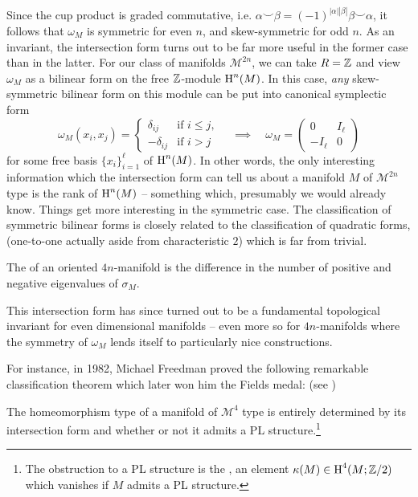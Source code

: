 
Since the cup product is graded commutative, i.e. $\alpha\smile \beta = (-1)^{|\alpha||\beta|} \beta\smile\alpha$, it follows that $\omega_M$ is symmetric for even $n$, and skew-symmetric for odd $n$. As an invariant, the intersection form turns out to be far more useful in the former case than in the latter.
For our class of manifolds $\mathscr{M}^{2n}$, we can take $R=\mathbb{Z}$ and view $\omega_M$ as a bilinear form on the free $\mathbb{Z}$-module $\operatorname{H}^n(M)$. In this case, \emph{any} skew-symmetric bilinear form on this module can be put into canonical symplectic form
\[
	\omega_M(x_i, x_j) = \begin{cases}\delta_{ij} & \textrm{if }i \leq j, \\ -\delta_{ij} & \textrm{if }i > j\end{cases} \quad\implies\quad \omega_M =\begin{pmatrix}0 & I_\ell \\ -I_\ell & 0\end{pmatrix}
\]
for some free basis $\{x_i\}^\ell_{i=1}$ of $\operatorname{H}^n(M)$. In other words, the only interesting information which the intersection form can tell us about a manifold $M$ of $\mathscr{M}^{2n}$ type is the rank of $\operatorname{H}^n(M)$ -- something which, presumably we would already know.
Things get more interesting in the symmetric case. The classification of symmetric bilinear forms is closely related to the classification of quadratic forms, (one-to-one actually aside from characteristic $2$) which is far from trivial.

\begin{definition}
	The  of an oriented $4n$-manifold is the difference in the number of positive and negative eigenvalues of $\sigma_M$.
\end{definition}

This intersection form has since turned out to be a fundamental topological invariant for even dimensional manifolds -- even more so for $4n$-manifolds where the symmetry of $\omega_M$ lends itself to particularly nice constructions.

For instance, in 1982, Michael Freedman proved the following remarkable classification theorem which later won him the Fields medal: (see \cite{freedman1982})

\begin{theorem}
	The homeomorphism type of a manifold of $\mathscr{M}^4$ type is entirely determined by its intersection form and whether or not it admits a PL structure.\footnote{The obstruction to a PL structure is the , an element $\kappa(M)\in \operatorname{H}^4(M;\mathbb{Z}/2)$ which vanishes if $M$ admits a PL structure. }
\end{theorem}

